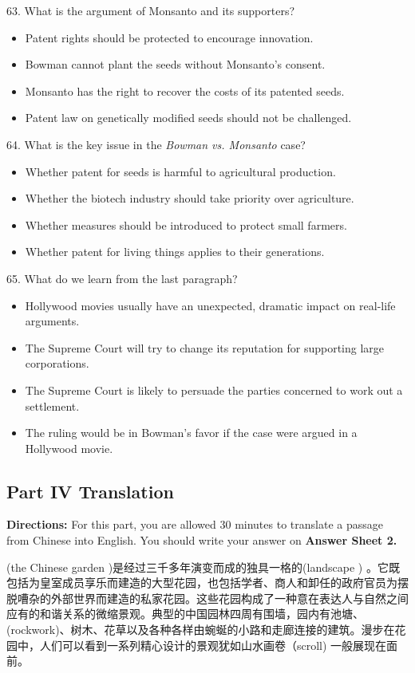 \documentclass[UTF8,11pt]{ctexart}
\begin{document}
63. What is the argument of Monsanto and its supporters?


\begin{itemize}[leftmargin=2em,itemsep=.2em,topsep=.4em]\item[A.] Patent rights should be protected to encourage innovation.
\item[B.] Bowman cannot plant the seeds without Monsanto’s consent.
\item[C.] Monsanto has the right to recover the costs of its patented seeds.
\item[D.] Patent law on genetically modified seeds should not be challenged.
\end{itemize}

64. What is the key issue in the\textit{ Bowman vs. Monsanto} case?


\begin{itemize}[leftmargin=2em,itemsep=.2em,topsep=.4em]\item[A.] Whether patent for seeds is harmful to agricultural production.
\item[B.] Whether the biotech industry should take priority over agriculture.
\item[C.] Whether measures should be introduced to protect small farmers.
\item[D.] Whether patent for living things applies to their generations.
\end{itemize}

65. What do we learn from the last paragraph?


\begin{itemize}[leftmargin=2em,itemsep=.2em,topsep=.4em]\item[A.] Hollywood movies usually have an unexpected, dramatic impact on real-life arguments.
\item[B.] The Supreme Court will try to change its reputation for supporting large corporations.
\item[C.] The Supreme Court is likely to persuade the parties concerned to work out a settlement.
\item[D.] The ruling would be in Bowman’s favor if the case were argued in a Hollywood movie.
\end{itemize}

\subsection*{\textbf{Part} IV \textbf{Translation}}


\textbf{Directions:} For this part, you are allowed 30 minutes to translate a passage from Chinese into English. You should write your answer on\textbf{ Answer Sheet 2.}


(the Chinese garden )是经过三千多年演变而成的独具一格的(landscape ) 。它既包括为皇室成员享乐而建造的大型花园，也包括学者、商人和卸任的政府官员为摆脱嘈杂的外部世界而建造的私家花园。这些花园构成了一种意在表达人与自然之间应有的和谐关系的微缩景观。典型的中国园林四周有围墙，园内有池塘、(rockwork)、树木、花草以及各种各样由蜿蜒的小路和走廊连接的建筑。漫步在花园中，人们可以看到一系列精心设计的景观犹如山水画卷（scroll) 一般展现在面前。
\end{document}
